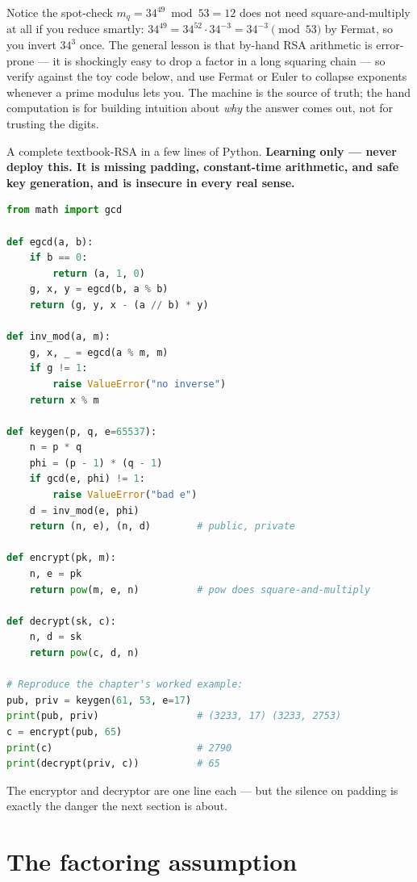 \begin{recoverybox}
Notice the spot-check $m_q = 34^{49}\bmod 53 = 12$ does not need square-and-multiply at all if you reduce smartly: $34^{49} = 34^{52}\cdot 34^{-3} = 34^{-3}\pmod{53}$ by Fermat, so you invert $34^3$ once. The general lesson is that by-hand RSA arithmetic is error-prone --- it is shockingly easy to drop a factor in a long squaring chain --- so verify against the toy code below, and use Fermat or Euler to collapse exponents whenever a prime modulus lets you. The machine is the source of truth; the hand computation is for building intuition about \emph{why} the answer comes out, not for trusting the digits.
\end{recoverybox}

\begin{implementbox}
A complete textbook-RSA in a few lines of Python. \textbf{Learning only --- never deploy this. It is missing padding, constant-time arithmetic, and safe key generation, and is insecure in every real sense.}
\begin{lstlisting}[language=Python]
from math import gcd

def egcd(a, b):
    if b == 0:
        return (a, 1, 0)
    g, x, y = egcd(b, a % b)
    return (g, y, x - (a // b) * y)

def inv_mod(a, m):
    g, x, _ = egcd(a % m, m)
    if g != 1:
        raise ValueError("no inverse")
    return x % m

def keygen(p, q, e=65537):
    n = p * q
    phi = (p - 1) * (q - 1)
    if gcd(e, phi) != 1:
        raise ValueError("bad e")
    d = inv_mod(e, phi)
    return (n, e), (n, d)        # public, private

def encrypt(pk, m):
    n, e = pk
    return pow(m, e, n)          # pow does square-and-multiply

def decrypt(sk, c):
    n, d = sk
    return pow(c, d, n)

# Reproduce the chapter's worked example:
pub, priv = keygen(61, 53, e=17)
print(pub, priv)                 # (3233, 17) (3233, 2753)
c = encrypt(pub, 65)
print(c)                         # 2790
print(decrypt(priv, c))          # 65
\end{lstlisting}
The encryptor and decryptor are one line each --- but the silence on padding is exactly the danger the next section is about.
\end{implementbox}

\section{The factoring assumption}
\label{ch19:factoring}

